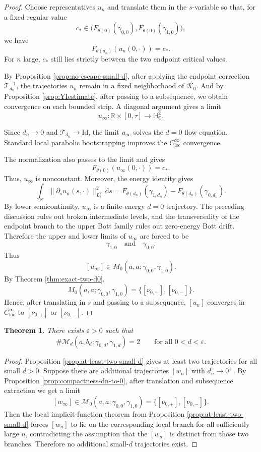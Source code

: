 \documentclass[11pt]{amsart}
\theoremstyle{plain}
\newtheorem{thm}{Theorem}[section]
\theoremstyle{definition}
\newcommand{\R}{\mathbb{R}}
\newcommand{\C}{\mathbb{C}}
\newcommand{\dd}{\mathrm d}
\newcommand{\HH}{\mathbb{H}}
\begin{document}
\begin{proof}
Choose representatives $u_n$ and translate them in the $s$-variable so
that, for a fixed regular value
\[
c_*\in\bigl(F_{\theta(0)}(\gamma_{0,0}),F_{\theta(0)}(\gamma_{1,0})\bigr),
\]
we have
\[
F_{\theta(d_n)}(u_n(0,\cdot))=c_* .
\]
For $n$ large, $c_*$ still lies strictly between the two endpoint critical
values.

By Proposition \ref{prop:no-escape-small-d}, after applying the endpoint correction
$\mathcal T_{d_n}^{-1}$, the trajectories $u_n$ remain in a fixed
neighborhood of $\mathcal{K}_0$. And by Proposition \ref{prop:YIestimate},
after passing to a subsequence, we obtain convergence on each bounded strip.
A diagonal argument gives a limit
\[
u_\infty:\R\times[0,\tau]\longrightarrow \HH^2_{\C}.
\]

Since $d_n\to0$ and $\mathcal T_{d_n}\to\mathrm{Id}$, the limit $u_\infty$ solves the $d=0$ flow
equation. Standard local parabolic bootstrapping improves the $C_{\mathrm{loc}}^{\infty}$ convergence. 

The normalization also passes to the limit and gives
\[
F_{\theta(0)}(u_\infty(0,\cdot))=c_*.
\]
Thus, $u_\infty$ is nonconstant. Moreover, the energy identity gives
\[
\int_{\R}\|\partial_su_n(s,\cdot)\|_{L_t^2}^2\,\dd s
=F_{\theta(d_n)}(\gamma_{1,d_n})-F_{\theta(d_n)}(\gamma_{0,d_n}).
\]
By lower semicontinuity, $u_\infty$ is a finite-energy $d=0$ trajectory.
The preceding discussion rules out broken intermediate levels,
and the transversality of the endpoint branch to the upper Bott family rules
out zero-energy Bott drift. Therefore the upper and lower limits of
$u_\infty$ are forced to be
\[
\gamma_{1,0}\quad\text{and}\quad\gamma_{0,0}.
\]
Thus
\[
[u_\infty]\in M_0(a,a;\gamma_{0,0},\gamma_{1,0}).
\]
By Theorem \ref{thm:exact-two-d0},
\[
M_0(a,a;\gamma_{0,0},\gamma_{1,0})
=\{[\nu_{0,+}],[\nu_{0,-}]\}.
\]
Hence, after translating in $s$ and passing to a subsequence,
$[u_n]$ converges in $C^\infty_{\mathrm{loc}}$ to $[\nu_{0,+}]$ or $[\nu_{0,-}]$.
\end{proof}


\begin{thm}\label{thm:exact-two-small-d}
There exists $\varepsilon>0$ such that
\[
\#\mathcal{M}_d(a,b_d;\gamma_{0,d},\gamma_{1,d})=2
\qquad\text{for all }0<d<\varepsilon.
\]
\end{thm}

\begin{proof}

Proposition \ref{prop:at-least-two-small-d} gives at least two trajectories for all small $d>0$. Suppose there are additional trajectories $[w_n]$ with $d_n\to 0^+$. By Proposition \ref{prop:compactness-dn-to-0}, after translation and subsequence extraction we get a limit
\[
[w_\infty]\in \mathcal{M}_0(a,a;\gamma_{0,0},\gamma_{1,0})
=\{[\nu_{0,+}],[\nu_{0,-}]\}.
\]
Then the local implicit-function theorem from Proposition \ref{prop:at-least-two-small-d} forces $[w_n]$ to lie on the corresponding local branch for all sufficiently large $n$, contradicting the assumption that the $[w_n]$ is distinct from those two branches.
Therefore no additional small-$d$ trajectories exist.
\end{proof}
\end{document}
